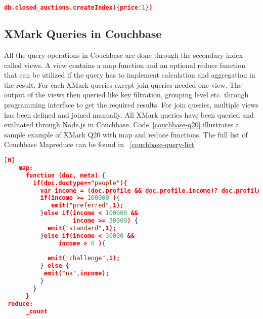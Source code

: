 \begin{lstlisting}[language=JSON, caption=MongoDB secondary Index, label=mongodb-create-index, basicstyle=\scriptsize]
   db.closed_auctions.createIndex({price:1})
\end{lstlisting}

\subsection{XMark Queries in Couchbase}
 All the query operations in Couchbase are done through the secondary index called views. A view contains a map function and an optional reduce function that can be utilized if the query has to implement calculation and aggregation in the result. For each XMark queries except join queries needed one view. The output of the views then queried like key filtration, grouping level etc. through programming interface to get the required results. For join queries, multiple views has been defined and joined manually. All XMark queries have been queried and evaluated through Node.js in Couchbase. 
Code~\ref{couchbase-q20} illustrates a sample example of XMark  Q20 with map and reduce functions. The full list of Couchbase Mapreduce can be found in ~\ref{couchbase-query-list}
\begin{lstlisting}[language=JSON, caption=XMark query Q20 in Couchbase Server, label=couchbase-q20,  basicstyle=\scriptsize][H]
	map:
	  function (doc, meta) {
	    if(doc.doctype=="people"){
	      var income = (doc.profile && doc.profile.income)? doc.profile.income : 0;
	      if(income >= 100000 ){
	    	 emit("preferred",1);
	      }else if(income < 100000 && 
	               income >= 30000) {
	        emit("standard",1);
	      }else if(income < 30000 &&
	           income > 0 ){
	       
	        emit("challenge",1);
	      } else {
	       emit("na",income);
	      }
	    }
	  }
 reduce:
	  _count
\end{lstlisting}

